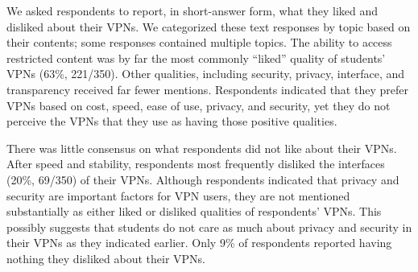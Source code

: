 We asked respondents to report, in short-answer form, what they liked and
disliked about their VPNs. We categorized these text responses by topic based
on their contents; some responses contained multiple topics. The ability to
access restricted content was by far the most commonly “liked” quality of
students’ VPNs (63\%, 221/350). Other qualities, including security, privacy,
interface, and transparency received far fewer mentions. Respondents indicated
that they prefer VPNs based on cost, speed, ease of use, privacy, and
security, yet they do not perceive the VPNs that they use as having those
positive qualities.

There was little consensus on what respondents did not like about their VPNs.
After speed and stability, respondents most frequently disliked the interfaces
(20\%, 69/350) of their VPNs. Although respondents indicated that privacy and
security are important factors for VPN users, they are not mentioned
substantially as either liked or disliked qualities of respondents’ VPNs. This
possibly suggests that students do not care as much about privacy and security
in their VPNs as they indicated earlier. Only 9\% of respondents reported
having nothing they disliked about their VPNs.





